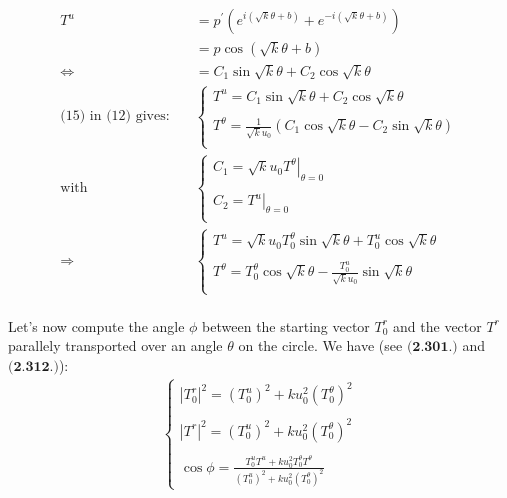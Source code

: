 \begin{align}
T^u  &= p^{'}\left( e^{i(\sqrt{k} \theta + b)}+ e^{-i(\sqrt{k} \theta + b)}\right)\\
 &= p\cos{\left(\sqrt{k} \theta + b \right)}\\
 \Leftrightarrow \quad &=   C_1\sin{\sqrt{k}\theta}+ C_2\cos{\sqrt{k}\theta}\\
 \text{(15) in (12) gives:}\quad & \left \{ \begin{array}{l}
T^u = C_1\sin{\sqrt{k}\theta}+ C_2\cos{\sqrt{k}\theta}\\\\
T^{\theta}  =  \frac{1}{\sqrt{k}u_0}\left(C_1\cos{\sqrt{k}\theta}- C_2\sin{\sqrt{k}\theta}\right)\\
\end{array} \right.\\
\text{with} \quad & \left \{ \begin{array}{l}
 C_1=\sqrt{k}u_0\left.T^{\theta}\right|_{\theta=0} \\\\
 C_2=\left.T^{u}\right|_{\theta=0}\\
\end{array} \right.\\
\Rightarrow \quad & \left \{ \begin{array}{l}
T^u = \sqrt{k} u_0 T^{\theta}_{0}\sin{\sqrt{k}\theta}+ T^{u}_{0}\cos{\sqrt{k}\theta}\\\\
T^{\theta}  =   T^{\theta}_{0}\cos{\sqrt{k}\theta}- \frac{T^{u}_{0}}{\sqrt{k}u_0} \sin{\sqrt{k}\theta}\\
\end{array}\right.
\end{align}\\
Let's now compute the angle $\phi$ between the starting vector $T^r_{0}$ and the vector $T^r$ parallely transported over an angle $\theta$ on the circle. We have (see $\textbf{(2.301.)}$ and $\textbf{(2.312.)}$):
\begin{align}
\left \{ \begin{array}{l}
 \left| T^r_0 \right|^2 =  \left(T^u_0\right)^2 + k u^2_0\left(T^{\theta}_0\right)^2\\\\
 \left| T^r \right|^2 =  \left(T^u_0\right)^2 + k u^2_0\left(T^{\theta}_0\right)^2\\\\
 \cos{\phi} =  \frac{T^u_0 T^u+k u^2_0T^{\theta}_0 T^{\theta} }{\left(T^u_0\right)^2 + k u^2_0\left(T^{\theta}_0\right)^2}
\end{array} \right.
\end{align}
